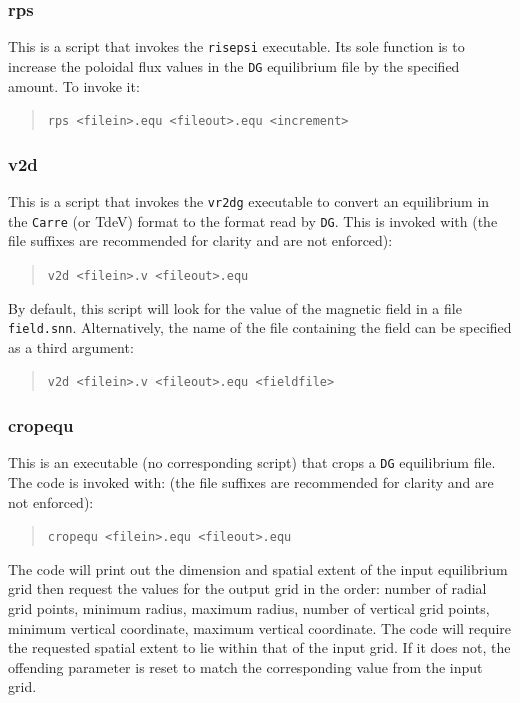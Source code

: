 \documentclass[a4paper,10pt]{report}
\begin{document}
\subsubsection{rps}

This is a script that invokes the {\tt risepsi} executable.
Its sole
function is to increase the poloidal flux values in the
{\tt DG} equilibrium file by the specified amount.  To
invoke it:
\begin{quote}
{\tt rps <filein>.equ <fileout>.equ <increment>}
\end{quote}

\subsubsection{v2d}

This is a script that invokes the {\tt vr2dg}
executable to convert an equilibrium in the {\tt Carre} (or TdeV) format
to the format read by {\tt DG}.
This is invoked with (the file suffixes are recommended for clarity
and are not enforced):
\begin{quote}
{\tt v2d <filein>.v <fileout>.equ}
\end{quote}

By default, this script will look for the value of the magnetic field
in a file {\tt field.snn}.
Alternatively, the name of the file containing the field can be
specified as a third argument:
\begin{quote}
{\tt v2d <filein>.v <fileout>.equ <fieldfile>}
\end{quote}

\subsubsection{cropequ}

This is an executable (no corresponding script) that crops a
{\tt DG} equilibrium file. The code is invoked with:
(the file suffixes are recommended for clarity
and are not enforced):
\begin{quote}
{\tt cropequ <filein>.equ <fileout>.equ}
\end{quote}

The code will print out the dimension and spatial extent of the input
equilibrium grid then request the values for the output grid in the
order: number of radial grid points, minimum radius, maximum radius,
number of vertical grid points, minimum vertical coordinate,
maximum vertical coordinate. The code
will require the requested spatial extent to lie within that of the
input grid.  If it does not, the offending parameter is reset to
match the corresponding value from the input grid.
\end{document}
